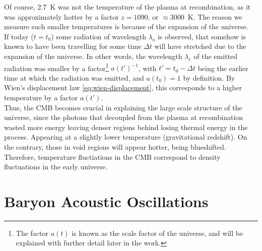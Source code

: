 Of course, \SI{2.7}{K} was not the temperature of the plasma at recombination, as it was approximately hotter by a factor $z=1090$, or $\approx$\SI{3000}{K}. The reason we measure such smaller temperatures is because of the expansion of the universe. \\
If today ($t=t_0$) some radiation of wavelength $\lambda_o$ is observed, that somehow is known to have been travelling for some time $\Delta t$ will have stretched due to the expansion of the universe. In other words, the wavelength $\lambda_e$ of the emitted radiation was smaller by a factor\footnote{The factor $a(t)$ is known as the scale factor of the universe, and will be explained with further detail later in the work.} $a(t')^{-1}$, with $t' = t_0-\Delta t$ being the earlier time at which the radiation was emitted, and $a(t_0)=1$ by definition. By Wien's displacement law \eqref{eq:wien-displacement}, this corresponds to a higher temperature by a factor $a(t')$. \\


Thus, the CMB becomes crucial in explaining the large scale structure of the universe, since the photons that decoupled from the plasma at recombination wasted more energy leaving denser regions behind losing thermal energy in the process. Appearing at a slightly lower temperature (gravitational redshift). On the contrary, those in void regions will appear hotter, being blueshifted. Therefore, temperature fluctiations in the CMB correspond to density fluctuations in the early universe. \\

\section{Baryon Acoustic Oscillations}

